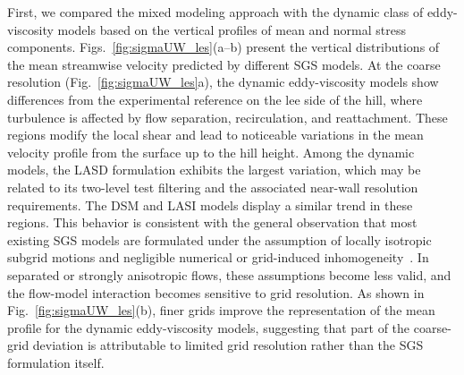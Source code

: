 \documentclass[%
superscriptaddress,
 amsmath,amssymb,
pra,
showkeys,
]{revtex4-2}
\begin{document}
First, we compared the mixed modeling approach with the dynamic class of eddy-viscosity models based on the vertical profiles of mean and normal stress components. Figs.~\ref{fig:sigmaUW_les}(a--b) present the vertical distributions of the mean streamwise velocity predicted by different SGS models. At the coarse resolution (Fig.~\ref{fig:sigmaUW_les}a), the dynamic eddy-viscosity models show differences from the experimental reference on the lee side of the hill, where turbulence is affected by flow separation, recirculation, and reattachment. These regions modify the local shear and lead to noticeable variations in the mean velocity profile from the surface up to the hill height. Among the dynamic models, the LASD formulation exhibits the largest variation, which may be related to its two-level test filtering and the associated near-wall resolution requirements. The DSM and LASI models display a similar trend in these regions. This behavior is consistent with the general observation that most existing SGS models are formulated under the assumption of locally isotropic subgrid motions and negligible numerical or grid-induced inhomogeneity~\cite{moser2021statistical,rozema2015minimum}. In separated or strongly anisotropic flows, these assumptions become less valid, and the flow-model interaction becomes sensitive to grid resolution. As shown in Fig.~\ref{fig:sigmaUW_les}(b), finer grids improve the representation of the mean profile for the dynamic eddy-viscosity models, suggesting that part of the coarse-grid deviation is attributable to limited grid resolution rather than the SGS formulation itself.
\end{document}
